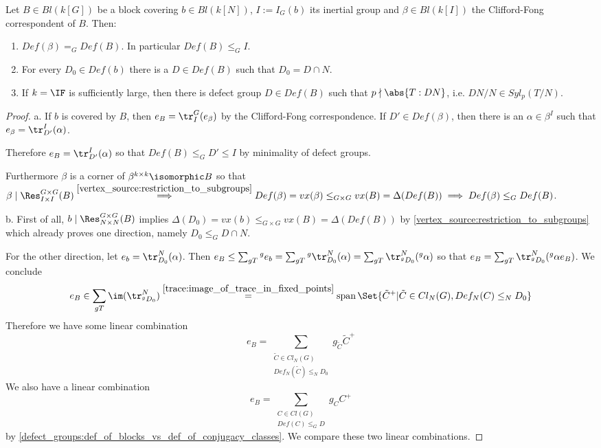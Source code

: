\begin{corollary}
Let $B\in Bl(k[G])$ be a block covering $b\in Bl(k[N])$, $I:=I_G(b)$ its inertial group and $\beta\in Bl(k[I])$ the Clifford-Fong correspondent of $B$. Then:
\begin{enumerate}
\item $Def(\beta) =_G Def(B)$. In particular $Def(B) \leq_G I$.
\item For every $D_0\in Def(b)$ there is a $D\in Def(B)$ such that $D_0=D\cap N$.
\item If $k=\IF$ is sufficiently large, then there is defect group $D\in Def(B)$ such that $p \nmid \abs{T:DN}$, i.e. $DN/N \in Syl_p(T/N)$.
\end{enumerate}
\end{corollary}
\begin{proof}
a. If $b$ is covered by $B$, then $e_B=\tr_I^G(e_\beta)$ by the Clifford-Fong correspondence. If $D'\in Def(\beta)$, then there is an $\alpha\in \beta^I$ such that $e_\beta=\tr_{D'}^I(\alpha)$.

Therefore $e_B = \tr_{D'}^I(\alpha)$ so that $Def(B) \leq_G D' \leq I$ by minimality of defect groups.

Furthermore $\beta$ is a corner of $\beta^{k\times k} \isomorphic B$ so that $\beta \mid \Res_{I\times I}^{G\times G}(B) \overset{\ref{vertex_source:restriction_to_subgroups}}{\implies} Def(\beta) = vx(\beta) \leq_{G\times G} vx(B)=\Delta(Def(B)) \implies Def(\beta) \leq_G Def(B)$.

\medbreak
b. First of all, $b \mid \Res_{N\times N}^{G\times G}(B)$ implies $\Delta(D_0)=vx(b) \leq_{G\times G} vx(B) = \Delta(Def(B))$ by \ref{vertex_source:restriction_to_subgroups} which already proves one direction, namely $D_0 \leq_G D\cap N$.

\smallbreak
For the other direction, let $e_b = \tr_{D_0}^N(\alpha)$. Then $e_B \leq \sum_{gT} {^g e_b} = \sum_{gT} {^g \tr_{D_0}^N(\alpha)} = \sum_{gT} \tr_{^g D_0}^N({^g \alpha})$ so that $e_B = \sum_{gT} \tr_{^g D_0}^N({^g \alpha}e_B)$. We conclude 
\[e_B \in \sum_{gT} \im(\tr_{^g D_0}^N) \overset{\ref{trace:image_of_trace_in_fixed_points}}{=} \operatorname{span}\Set{\tilde{C}^+ | \tilde{C}\in Cl_N(G), Def_N(C) \leq_N D_0}\]
Therefore we have some linear combination
\[e_B = \sum_{\substack{\tilde{C}\in Cl_N(G) \\ Def_N(\tilde{C}) \leq_N D_0}}  g_{\tilde{C}} \tilde{C}^+\]
We also have a linear combination
\[e_B = \sum_{\substack{C\in Cl(G) \\ Def(C) \leq_G D}}  g_C C^+\]
by \ref{defect_groups:def_of_blocks_vs_def_of_conjugacy_classes}. We compare these two linear combinations.


\end{proof}
